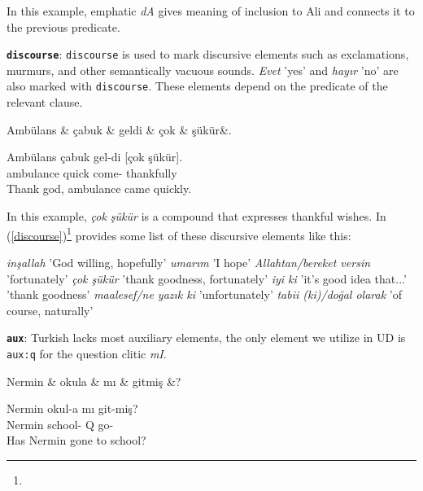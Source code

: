 \documentclass[11pt,a4paper]{article}
\begin{document}
In this example, emphatic \textit{dA} gives meaning of inclusion to Ali and connects it to the previous predicate.

\textbf{\texttt{discourse}}:
\texttt{discourse} is used to mark discursive elements such as exclamations, murmurs, and other semantically vacuous sounds. \textit{Evet} 'yes' and \textit{hayır} 'no' are also marked with \texttt{discourse}. These elements depend on the predicate of the relevant clause.  

\begin{exe}
\ex \label{discourse}
\begin{dependency}
\begin{deptext}[column sep=0.24cm]
Ambülans \& çabuk \& geldi \& çok \& şükür\&. \\
\end{deptext}
\end{dependency}
\gll Ambülans çabuk gel-di [çok şükür].  \\
ambulance quick come-\Pst{} thankfully  \\
\glt Thank god, ambulance came quickly.
\end{exe}

In this example, \textit{çok şükür} is a compound that expresses thankful wishes. In (\ref{discourse})\footnote{\printglossaries} \citep{goksel2004turkish} provides some list of these discursive elements like this:

\begin{exe}
\ex \label{discourse}
\textit{inşallah} 'God willing, hopefully'
\textit{umarım} 'I hope'
\textit{Allahtan/bereket versin} 'fortunately'
\textit{çok şükür} 'thank goodness, fortunately'
\textit{iyi ki} 'it's good idea that...' 'thank goodness'
\textit{maalesef/ne yazık ki} 'unfortunately'
\textit{tabii (ki)/doğal olarak} 'of course, naturally'
\end{exe}

\textbf{\texttt{aux}}:
Turkish lacks most auxiliary elements, the only element we utilize in UD is \texttt{aux:q} for the question clitic \textit{mI}.

\begin{exe}
\ex \label{aux:q}
\begin{dependency}
\begin{deptext}[column sep=0.32cm]
Nermin \& okula \& mı \& gitmiş \&? \\
\end{deptext}
\end{dependency}
\gll Nermin okul-a mı git-miş?  \\
Nermin school-\Dat{} Q go-\Pst{} \\
\glt Has Nermin gone to school?
\end{exe}
\end{document}
